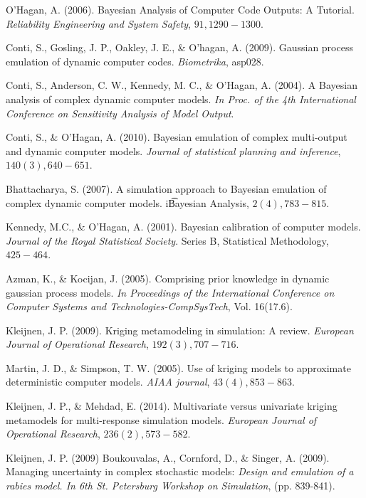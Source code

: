 \documentclass[12pt,titlepage]{report}
\theoremstyle{definition}
\theoremstyle{remark}
\begin{document}
\begin{thebibliography}{94}
 O'Hagan, A. (2006). Bayesian Analysis of Computer Code Outputs: A Tutorial. {\it Reliability Engineering and System Safety}, $91, 1290-1300$.

 Conti, S., Gosling, J. P., Oakley, J. E., \& O'hagan, A. (2009). Gaussian process emulation of dynamic computer codes. {\it Biometrika}, asp028.

 Conti, S., Anderson, C. W., Kennedy, M. C., \& O’Hagan, A. (2004). A Bayesian analysis of complex dynamic computer models. {\it In Proc. of the 4th International Conference on Sensitivity Analysis of Model Output}.

 Conti, S., \& O’Hagan, A. (2010). Bayesian emulation of complex multi-output and dynamic computer models. {\it Journal of statistical planning and inference}, $140(3), 640-651$.

 Bhattacharya, S. (2007). A simulation approach to Bayesian emulation of complex dynamic computer models. {i\t Bayesian Analysis}, $2(4), 783-815$.

 Kennedy, M.C., \& O'Hagan, A. (2001). Bayesian calibration of computer models. {\it Journal of the Royal Statistical Society}. Series B, Statistical Methodology, $425-464$.

 Azman, K., \& Kocijan, J. (2005). Comprising prior knowledge in dynamic gaussian process models. {\it In Proceedings of the International Conference on Computer Systems and Technologies-CompSysTech}, Vol. 16(17.6).

 Kleijnen, J. P. (2009). Kriging metamodeling in simulation: A review. {\it European Journal of Operational Research}, $192(3), 707-716$.

 Martin, J. D., \& Simpson, T. W. (2005). Use of kriging models to approximate deterministic computer models. {\it AIAA journal}, $43(4), 853-863$.

 Kleijnen, J. P., \& Mehdad, E. (2014). Multivariate versus univariate kriging metamodels for multi-response simulation models. {\it European Journal of Operational Research}, $236(2), 573-582$.

 Kleijnen, J. P. (2009) Boukouvalas, A., Cornford, D., \& Singer, A. (2009). Managing uncertainty in complex stochastic models: {\it Design and emulation of a rabies model. In 6th St. Petersburg Workshop on Simulation}, (pp. 839-841).


\end{thebibliography}
\end{document}
